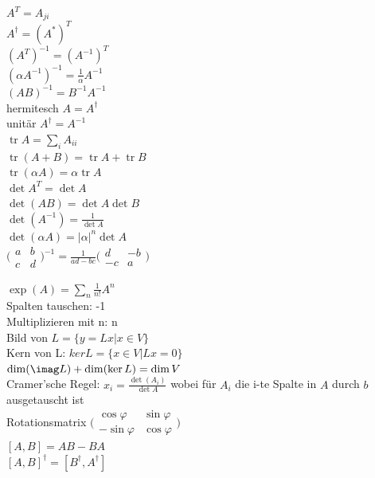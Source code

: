 \documentclass[12pt,a4paper]{article}
\DeclareMathOperator{\tr}{tr}
\newcommand{\abs}[1]{\left| #1 \right|}
\renewcommand{\=}[1]{\stackrel{#1}{=}}
\theoremstyle{definition}
\theoremstyle{remark}
\begin{document}
\begin{center}
\begin{minipage}[t]{.49\linewidth}
\vspace{0pt}
$A^T = A_{ji}$\\
$A^{\dagger} = (A^*)^T$\\
$(A^T)^{-1} = (A^{-1})^T$\\
$(\alpha A^{-1})^{-1} = \frac{1}{\alpha} A^{-1}$\\
$(AB)^{-1} = B^{-1} A^{-1}$\\
hermitesch $A = A^{\dagger}$\\
unitär $A^{\dagger} = A^{-1}$\\
$\tr A = \sum_i A_{ii}$\\
$\tr (A+B) = \tr A + \tr B$\\
$\tr (\alpha A) = \alpha \tr A$\\
$\det A^T = \det A$\\
$\det (AB) = \det A \det B$\\
$\det (A^{-1}) = \frac{1}{\det A}$\\
$\det (\alpha A) = \abs{\alpha}^n \det A$\\
$\bigl(\begin{smallmatrix} a & b\\
c & d \end{smallmatrix}\bigr)^{-1} = \frac{1}{ad-bc} \bigl(\begin{smallmatrix} d & -b\\
-c & a \end{smallmatrix}\bigr)$\\


\end{minipage}%
\begin{minipage}[t]{.49\linewidth}
\vspace{0pt}

$\exp (A) = \sum_n \frac{1}{n!} A^n$\\
Spalten tauschen: -1\\
Multiplizieren mit n: n\\
Bild von $L = \{y = Lx | x \in V\}$\\
Kern von L: $ker L = \{x \in V | L x = 0\}$\\
$\dim(\imag L) + \dim(\ker L) = \dim V$\\
Cramer'sche Regel: $x_i = \frac{\det (A_i)}{\det A}$ wobei für $A_i$ die i-te Spalte in $A$ durch $b$ ausgetauscht ist\\
Rotationsmatrix $\bigl(\begin{smallmatrix} \cos \varphi & \sin \varphi\\
-\sin \varphi & \cos \varphi \end{smallmatrix}\bigr)$\\
$[A, B] = AB-BA$\\
$[A,B]^{\dagger} = [B^{\dagger}, A^{\dagger}]$\\
\end{minipage}
\end{center}
\end{document}
